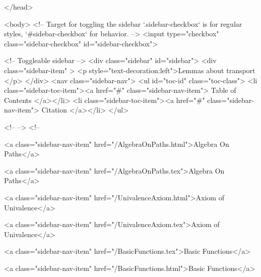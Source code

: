   
</head>




  <body>
    <!-- Target for toggling the sidebar `.sidebar-checkbox` is for regular
     styles, `#sidebar-checkbox` for behavior. -->
<input type="checkbox" class="sidebar-checkbox" id="sidebar-checkbox">

<!-- Toggleable sidebar -->
<div class="sidebar" id="sidebar">
  <div class="sidebar-item" >
    <p style="text-decoration:left">Lemmas about transport </p>
  </div>
  <nav class="sidebar-nav">
    <ul id="toc-id" class="toc-class">
  <li class="sidebar-toc-item"><a href="#" class="sidebar-nav-item"> Table of Contents </a></li>
  <li class="sidebar-toc-item"><a href="#" class="sidebar-nav-item"> Citation </a></li>
</ul>


    <!--  -->
    <!-- 
      
    
      
    
      
    
      
        
      
    
      
        
          <a class="sidebar-nav-item" href="/AlgebraOnPaths.html">Algebra On Paths</a>
        
      
    
      
        
          <a class="sidebar-nav-item" href="/AlgebraOnPaths.tex">Algebra On Paths</a>
        
      
    
      
        
          <a class="sidebar-nav-item" href="/UnivalenceAxiom.html">Axiom of Univalence</a>
        
      
    
      
        
          <a class="sidebar-nav-item" href="/UnivalenceAxiom.tex">Axiom of Univalence</a>
        
      
    
      
        
          <a class="sidebar-nav-item" href="/BasicFunctions.tex">Basic Functions</a>
        
      
    
      
        
          <a class="sidebar-nav-item" href="/BasicFunctions.html">Basic Functions</a>
        
      
    
      
        
